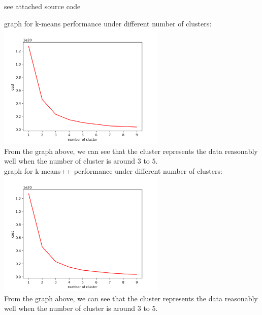 \documentclass{cis320}
\begin{document}
\maketitle
\HWproblem
see attached source code

\HWproblem
graph for k-means performance under different number of clusters:\\
\includegraphics[width=8cm, height=6cm]{performance_k}\\
From the graph above, we can see that the cluster represents the data reasonably well when the number of cluster is around $3$ to $5$.\\
graph for k-means++ performance under different number of clusters:\\
\includegraphics[width=8cm, height=6cm]{performance_k++}\\
From the graph above, we can see that the cluster represents the data reasonably well when the number of cluster is around $3$ to $5$.\\
\end{document}
